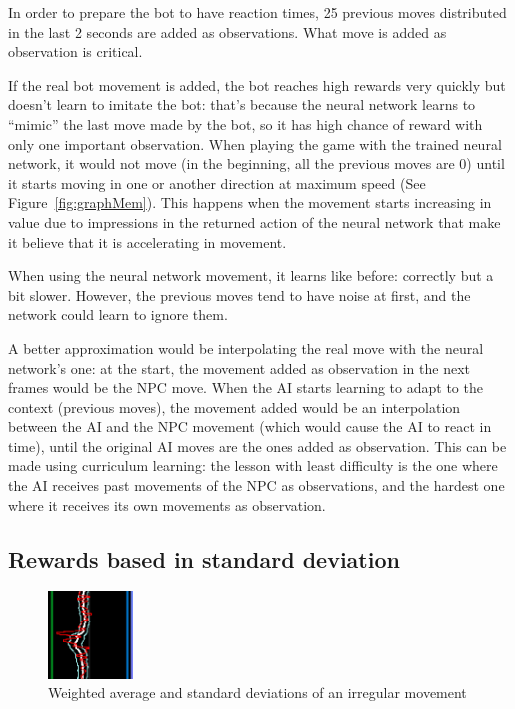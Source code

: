 In order to prepare the bot to have reaction times, 25 previous moves distributed in the last 2 seconds are added as observations. What move is added as observation is critical.

If the real bot movement is added, the bot reaches high rewards very quickly but doesn't learn to imitate the bot: that's because the neural network learns to ``mimic'' the last move made by the bot, so it has high chance of reward with only one important observation. When playing the game with the trained neural network, it would not move (in the beginning, all the previous moves are 0) until it starts moving in one or another direction at maximum speed (See Figure~\ref{fig:graphMem}). This happens when the movement starts increasing in value due to impressions in the returned action of the neural network that make it believe that it is accelerating in movement.

When using the neural network movement, it learns like before: correctly but a bit slower. However, the previous moves tend to have noise at first, and the network could learn to ignore them.

A better approximation would be interpolating the real move with the neural network's one: at the start, the movement added as observation in the next frames would be the NPC move. When the AI starts learning to adapt to the context (previous moves), the movement added would be an interpolation between the AI and the NPC movement (which would cause the AI to react in time), until the original AI moves are the ones added as observation. This can be made using curriculum learning: the lesson with least difficulty is the one where the AI receives past movements of the NPC as observations, and the hardest one where it receives its own movements as observation.

\subsection{Rewards based in standard deviation}
\label{sec:stdrew}

\begin{figure}
    \centering
    \includegraphics[width=0.2\textwidth]{img/graphSTD.png}
		\caption{Weighted average and standard deviations of an irregular movement}
		\label{fig:stdexample}
\end{figure}

